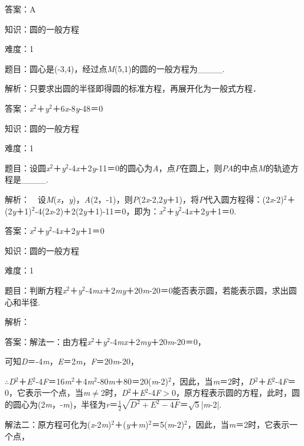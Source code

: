 \documentclass{article} %
\begin{document}
答案：A

知识：圆的一般方程

难度：1

题目：圆心是(-3,4)，经过点\textit{M}(5,1)的圆的一般方程为\_\_\_\_.

解析：只要求出圆的半径即得圆的标准方程，再展开化为一般式方程．

答案：\textit{x}${}^{2}$＋\textit{y}${}^{2}$＋6\textit{x}-8\textit{y}-48＝0

知识：圆的一般方程

难度：1

题目：设圆\textit{x}${}^{2}$＋\textit{y}${}^{2}$-4\textit{x}＋2\textit{y}-11＝0的圆心为\textit{A}，点\textit{P}在圆上，则\textit{PA}的中点\textit{M}的轨迹方程是\_\_\_\_.

解析：　设\textit{M}(\textit{x}，\textit{y})，\textit{A}(2，-1)，则\textit{P}(2\textit{x}-2,2\textit{y}＋1)，将\textit{P}代入圆方程得：(2\textit{x}-2)${}^{2}$＋(2\textit{y}＋1)${}^{2}$-4(2\textit{x}-2)＋2(2\textit{y}＋1)-11＝0，即为：\textit{x}${}^{2}$＋\textit{y}${}^{2}$-4\textit{x}＋2\textit{y}＋1＝0.

答案：\textit{x}${}^{2}$＋\textit{y}${}^{2}$-4\textit{x}＋2\textit{y}＋1＝0

知识：圆的一般方程

难度：1

题目：判断方程\textit{x}${}^{2}$＋\textit{y}${}^{2}$-4\textit{mx}＋2\textit{my}＋20\textit{m}-20＝0能否表示圆，若能表示圆，求出圆心和半径.

解析：

答案：解法一：由方程\textit{x}${}^{2}$＋\textit{y}${}^{2}$-4\textit{mx}＋2\textit{my}＋20\textit{m}-20＝0，

可知\textit{D}＝-4\textit{m}，\textit{E}＝2\textit{m}，\textit{F}＝20\textit{m}-20，

$\mathrm{\therefore}$\textit{D}${}^{2}$＋\textit{E}${}^{2}$-4\textit{F}＝16\textit{m}${}^{2}$＋4\textit{m}${}^{2}$-80\textit{m}＋80＝20(\textit{m}-2)${}^{2}$，因此，当\textit{m}＝2时，\textit{D}${}^{2}$＋\textit{E}${}^{2}$-4\textit{F}＝0，它表示一个点，当\textit{m}$\mathrm{\neq}$2时，\textit{D}${}^{2}$＋\textit{E}${}^{2}$-4\textit{F}$\mathrm{>}$0，原方程表示圆的方程，此时，圆的圆心为(2\textit{m}，-\textit{m})，半径为\textit{r}＝$\frac{1}{2}\sqrt{D^2+E^2-4F}$＝$\sqrt{5}$|\textit{m}-2|.

解法二：原方程可化为(\textit{x}-2\textit{m})${}^{2}$＋(\textit{y}＋\textit{m})${}^{2}$＝5(\textit{m}-2)${}^{2}$，因此，当\textit{m}＝2时，它表示一个点，
\end{document}

